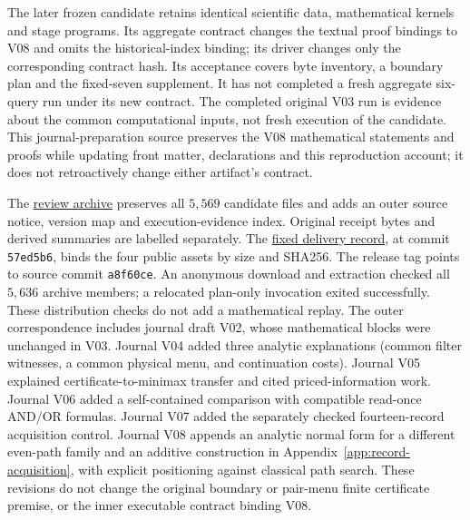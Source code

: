 \documentclass[pdflatex,sn-mathphys-num]{sn-jnl}
\theoremstyle{thmstyleone}
\theoremstyle{thmstylethree}
\theoremstyle{thmstyletwo}
\begin{document}
The later frozen candidate retains identical scientific data, mathematical kernels and stage programs. Its aggregate contract changes the textual proof bindings to V08 and omits the historical-index binding; its driver changes only the corresponding contract hash. Its acceptance covers byte inventory, a boundary plan and the fixed-seven supplement. It has not completed a fresh aggregate six-query run under its new contract. The completed original V03 run is evidence about the common computational inputs, not fresh execution of the candidate. This journal-preparation source preserves the V08 mathematical statements and proofs while updating front matter, declarations and this reproduction account; it does not retroactively change either artifact's contract.

The \href{https://github.com/SHiJiE1115/newproj/releases/tag/complete-six-review-20261011-v01}{review archive} preserves all $5,569$ candidate files and adds an outer source notice, version map and execution-evidence index. Original receipt bytes and derived summaries are labelled separately. The \href{https://github.com/SHiJiE1115/newproj/blob/57ed5b69243fec06c2a7a58f062f3793f6557738/theory/complete_six/PUBLIC_DELIVERY_RECEIPT_V01.json}{fixed delivery record}, at commit \texttt{57ed5b6}, binds the four public assets by size and SHA256. The release tag points to source commit \texttt{a8f60ce}. An anonymous download and extraction checked all $5,636$ archive members; a relocated plan-only invocation exited successfully. These distribution checks do not add a mathematical replay. The outer correspondence includes journal draft V02, whose mathematical blocks were unchanged in V03. Journal V04 added three analytic explanations (common filter witnesses, a common physical menu, and continuation costs). Journal V05 explained certificate-to-minimax transfer and cited priced-information work. Journal V06 added a self-contained comparison with compatible read-once AND/OR formulas. Journal V07 added the separately checked fourteen-record acquisition control. Journal V08 appends an analytic normal form for a different even-path family and an additive construction in Appendix~\ref{app:record-acquisition}, with explicit positioning against classical path search. These revisions do not change the original boundary or pair-menu finite certificate premise, or the inner executable contract binding V08.
\end{document}

